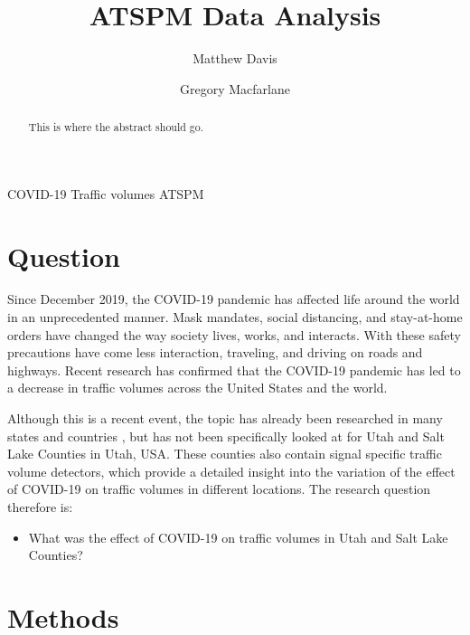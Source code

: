 \documentclass[3p, authoryear]{elsarticle} %
\providecommand{\tightlist}{%
  \setlength{\itemsep}{0pt}\setlength{\parskip}{0pt}}
\begin{document}
\begin{frontmatter}

  \title{ATSPM Data Analysis}
    \author[Brigham Young University]{Matthew Davis}
    \author[Brigham Young University]{Gregory Macfarlane}
      \address[Brigham Young University]{Civil and Environmental Engineering Department, 430 Engineering Building, Provo, Utah 84602}
  
  \begin{abstract}
  This is where the abstract should go.
  \end{abstract}
   \begin{keyword} COVID-19 Traffic volumes ATSPM\end{keyword}
 \end{frontmatter}

\hypertarget{intro}{%
\section{Question}\label{intro}}

Since December 2019, the COVID-19 pandemic has affected life around the world in an unprecedented manner. Mask mandates, social distancing, and stay-at-home orders have changed the way society lives, works, and interacts. With these safety precautions have come less interaction, traveling, and driving on roads and highways. Recent research has confirmed that the COVID-19 pandemic has led to a decrease in traffic volumes across the United States and the world.

Although this is a recent event, the topic has already been researched in many states and countries \citep{Lee2020, Lee2021, Muley2021}, but has not been specifically looked at for Utah and Salt Lake Counties in Utah, USA. These counties also contain signal specific traffic volume detectors, which provide a detailed insight into the variation of the effect of COVID-19 on traffic volumes in different locations. The research question therefore is:

\begin{itemize}
\tightlist
\item
  What was the effect of COVID-19 on traffic volumes in Utah and Salt Lake Counties?
\end{itemize}

\hypertarget{methods}{%
\section{Methods}\label{methods}}
\end{document}
